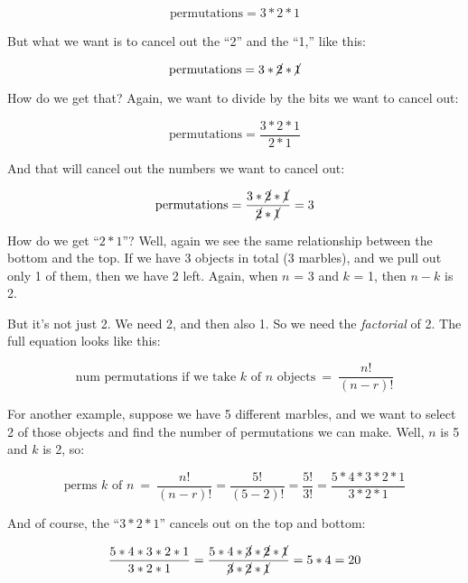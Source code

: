 \documentclass[../../../main.tex]{subfiles}
\begin{document}
\begin{equation*}
  \text{permutations} = 3 * 2 * 1
\end{equation*}

\noindent
But what we want is to cancel out the ``2'' and the ``1,'' like this:

\begin{equation*}
  \text{permutations} = 3 * \cancel{2} * \cancel{1}
\end{equation*}

\noindent
How do we get that? Again, we want to divide by the bits we want to cancel out:

\begin{equation*}
  \text{permutations} = \frac{3 * 2 * 1}{2 * 1}
\end{equation*}

\noindent
And that will cancel out the numbers we want to cancel out:

\begin{equation*}
  \text{permutations} = \frac{3 * \cancel{2} * \cancel{1}}{\cancel{2} * \cancel{1}} = 3
\end{equation*}

\noindent
How do we get ``$2 * 1$''? Well, again we see the same relationship between the bottom and the top. If we have 3 objects in total (3 marbles), and we pull out only 1 of them, then we have 2 left. Again, when $n$ = 3 and $k$ = 1, then $n - k$ is 2. 

But it's not just 2. We need 2, and then also 1. So we need the \emph{factorial} of 2. The full equation looks like this:

\begin{equation*}
  \text{num permutations if we take $k$ of $n$ objects}~=~\frac{n!}{(n - r)!}
\end{equation*}

\noindent
For another example, suppose we have 5 different marbles, and we want to select 2 of those objects and find the number of permutations we can make. Well, $n$ is 5 and $k$ is 2, so:

\begin{equation*}
  \text{perms $k$ of $n$}~=~\frac{n!}{(n - r)!} = \frac{5!}{(5 - 2)!} = \frac{5!}{3!} = \frac{5 * 4 * 3 * 2 * 1}{3 * 2 * 1}
\end{equation*}

\noindent
And of course, the ``$3 * 2 * 1$'' cancels out on the top and bottom:

\begin{equation*}
  \frac{5 * 4 * 3 * 2 * 1}{3 * 2 * 1} = \frac{5 * 4 * \cancel{3} * \cancel{2} * \cancel{1}}{\cancel{3} * \cancel{2} * \cancel{1}} = 5 * 4 = 20
\end{equation*}
\end{document}
